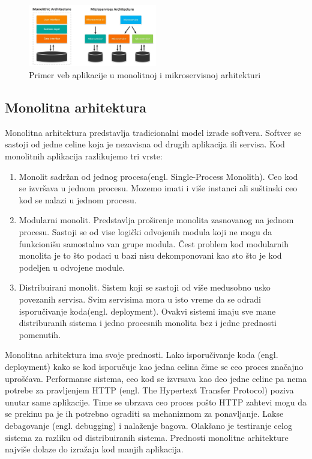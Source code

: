 \documentclass[12pt,oneside]{memoir}
\begin{document}
\begin{figure}[!ht]
  \centering
  \includegraphics[width=0.5\textwidth]{Slika 6.jpg}
  \caption{Primer veb aplikacije u monolitnoj i mikroservisnoj arhitekturi}
  \label{fig:arhitekturniProjektniUzorci}
\end{figure}

\subsection{Monolitna arhitektura}
Monolitna arhitektura predstavlja tradicionalni model izrade softvera. Softver se sastoji od jedne celine koja je nezavisna od drugih aplikacija ili servisa. Kod monolitnih aplikacija razlikujemo tri vrste\cite{bm}:
\begin{enumerate}
  \item Monolit sadržan od jednog procesa(engl. Single-Process Monolith). Ceo kod se izvršava u jednom procesu. Mozemo imati i više instanci ali suštinski ceo kod se nalazi u jednom procesu. 
  \item Modularni monolit. Predstavlja proširenje monolita zasnovanog na jednom procesu. Sastoji se od vise logički odvojenih modula koji ne mogu da funkcionišu samostalno van grupe modula. Čest problem kod modularnih monolita je to što podaci u bazi nisu dekomponovani kao sto što je kod podeljen u odvojene module.
  \item Distribuirani monolit. Sistem koji se sastoji od više međusobno usko povezanih servisa. Svim servisima mora u isto vreme da se odradi isporučivanje koda(engl. deployment). Ovakvi sistemi imaju sve mane distriburanih sistema i jedno procesnih monolita bez i jedne prednosti pomenutih.
\end{enumerate}
 
Monolitna arhitektura ima svoje prednosti. Lako isporučivanje koda (engl. deployment) kako se kod isporučuje kao jedna celina čime se ceo proces značajno uprošćava. Performanse sistema, ceo kod se izvrsava kao deo jedne celine pa nema potrebe za pravljenjem HTTP (engl. The Hypertext Transfer Protocol) poziva unutar same aplikacije. Time se ubrzava ceo proces pošto HTTP zahtevi mogu da se prekinu pa je ih potrebno ograditi sa mehanizmom za ponavljanje. Lakse debagovanje (engl. debugging) i nalaženje bagova. Olakšano je testiranje celog sistema za razliku od distribuiranih sistema. Prednosti monolitne arhitekture najviše dolaze do izražaja kod manjih aplikacija\cite{bm}.
 
\end{document}
